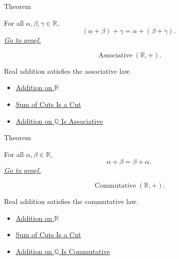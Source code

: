 \begin{theorembox}{Theorem}
\begin{theorem}
\label{thm:addition-on-r-associative}
For all $\alpha,\beta,\gamma\in\mathbb{R}$,
\[
(\alpha+\beta)+\gamma=\alpha+(\beta+\gamma).
\]
\hyperref[prf:addition-on-r-associative]{\textit{Go to proof.}}
\end{theorem}
\end{theorembox}

\begin{remark*}
\[
\operatorname{Associative}(\mathbb{R},+).
\]
\end{remark*}

\begin{remark*}[Interpretation]
Real addition satisfies the associative law.
\end{remark*}

\begin{dependencies}
\begin{itemize}
  \item \hyperref[def:addition-on-r]{Addition on $\mathbb{R}$}
  \item \hyperref[lem:sum-of-cuts-is-a-cut]{Sum of Cuts Is a Cut}
  \item \hyperref[thm:addition-on-q-associative]{Addition on $\mathbb{Q}$ Is Associative}
\end{itemize}
\end{dependencies}

\begin{theorembox}{Theorem}
\begin{theorem}
\label{thm:addition-on-r-commutative}
For all $\alpha,\beta\in\mathbb{R}$,
\[
\alpha+\beta=\beta+\alpha.
\]
\hyperref[prf:addition-on-r-commutative]{\textit{Go to proof.}}
\end{theorem}
\end{theorembox}

\begin{remark*}
\[
\operatorname{Commutative}(\mathbb{R},+).
\]
\end{remark*}

\begin{remark*}[Interpretation]
Real addition satisfies the commutative law.
\end{remark*}

\begin{dependencies}
\begin{itemize}
  \item \hyperref[def:addition-on-r]{Addition on $\mathbb{R}$}
  \item \hyperref[lem:sum-of-cuts-is-a-cut]{Sum of Cuts Is a Cut}
  \item \hyperref[thm:addition-on-q-commutative]{Addition on $\mathbb{Q}$ Is Commutative}
\end{itemize}
\end{dependencies}

